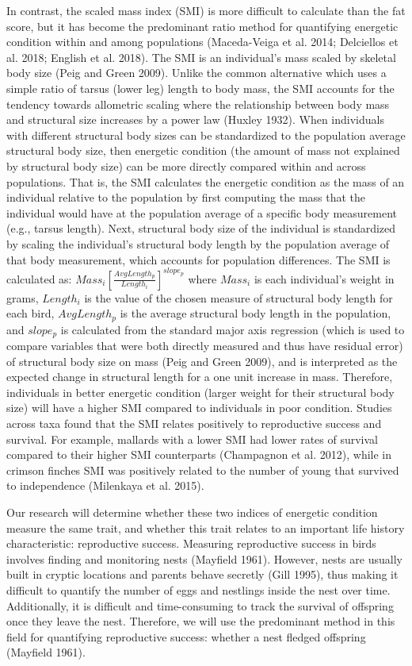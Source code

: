\documentclass[
]{article}
\begin{document}
In contrast, the scaled mass index (SMI) is more difficult to calculate
than the fat score, but it has become the predominant ratio method for
quantifying energetic condition within and among populations
(Maceda-Veiga et al. 2014; Delciellos et al. 2018; English et al. 2018).
The SMI is an individual's mass scaled by skeletal body size (Peig and
Green 2009). Unlike the common alternative which uses a simple ratio of
tarsus (lower leg) length to body mass, the SMI accounts for the
tendency towards allometric scaling where the relationship between body
mass and structural size increases by a power law (Huxley 1932). When
individuals with different structural body sizes can be standardized to
the population average structural body size, then energetic condition
(the amount of mass not explained by structural body size) can be more
directly compared within and across populations. That is, the SMI
calculates the energetic condition as the mass of an individual relative
to the population by first computing the mass that the individual would
have at the population average of a specific body measurement (e.g.,
tarsus length). Next, structural body size of the individual is
standardized by scaling the individual's structural body length by the
population average of that body measurement, which accounts for
population differences. The SMI is calculated as:
\(Mass_i\left[ \frac{AvgLength_p}{Length_i} \right]^{slope_p}\) where
\(Mass_i\) is each individual's weight in grams, \(Length_i\) is the
value of the chosen measure of structural body length for each bird,
\(AvgLength_p\) is the average structural body length in the population,
and \(slope_p\) is calculated from the standard major axis regression
(which is used to compare variables that were both directly measured and
thus have residual error) of structural body size on mass (Peig and
Green 2009), and is interpreted as the expected change in structural
length for a one unit increase in mass. Therefore, individuals in better
energetic condition (larger weight for their structural body size) will
have a higher SMI compared to individuals in poor condition. Studies
across taxa found that the SMI relates positively to reproductive
success and survival. For example, mallards with a lower SMI had lower
rates of survival compared to their higher SMI counterparts (Champagnon
et al. 2012), while in crimson finches SMI was positively related to the
number of young that survived to independence (Milenkaya et al. 2015).

Our research will determine whether these two indices of energetic
condition measure the same trait, and whether this trait relates to an
important life history characteristic: reproductive success. Measuring
reproductive success in birds involves finding and monitoring nests
(Mayfield 1961). However, nests are usually built in cryptic locations
and parents behave secretly (Gill 1995), thus making it difficult to
quantify the number of eggs and nestlings inside the nest over time.
Additionally, it is difficult and time-consuming to track the survival
of offspring once they leave the nest. Therefore, we will use the
predominant method in this field for quantifying reproductive success:
whether a nest fledged offspring (Mayfield 1961).
\end{document}
